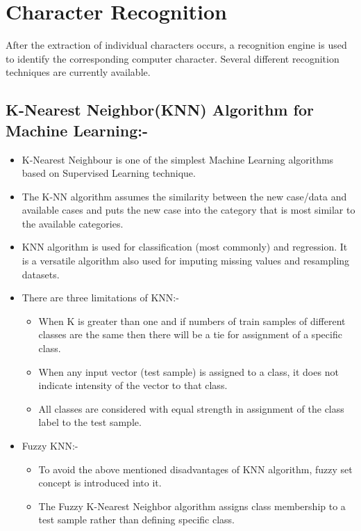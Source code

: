 \section{Character Recognition}
After the extraction of individual characters occurs, a recognition engine is used to identify the corresponding computer character. Several different recognition techniques are currently available.

\subsection{K-Nearest Neighbor(KNN) Algorithm for Machine Learning:-}
\begin{itemize}
\item K-Nearest Neighbour is one of the simplest Machine Learning algorithms based on Supervised Learning technique.
\item The K-NN algorithm assumes the similarity between the new case/data and available cases and puts the new case into the category that is most similar to the available categories.
\item KNN algorithm is used for classification (most commonly) and regression. It is a versatile algorithm also used for imputing missing values and resampling datasets.
\item There are three limitations of KNN:-
\begin{itemize}
\item When K is greater than one and if numbers of train samples of different classes are the same then there will be a tie for assignment of a specific class.
\item When any input vector (test sample) is assigned to a class, it does not indicate intensity of the vector to that class.
\item All classes are considered with equal strength in assignment of the class label to the test sample.
\end{itemize}
\item Fuzzy KNN:-
\begin{itemize}
\item To avoid the above mentioned disadvantages of KNN algorithm, fuzzy set concept is introduced into it.
\item The Fuzzy K-Nearest Neighbor algorithm assigns class membership to a test sample rather than defining specific class.
\end{itemize}
\end{itemize}

